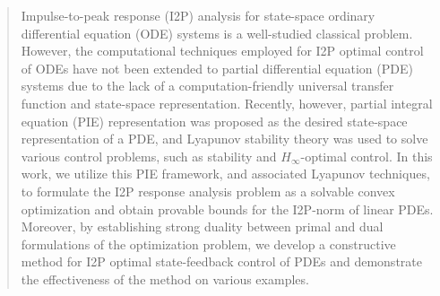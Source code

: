 \documentclass[letterpaper, 10 pt, conference]{ieeeconf}
\theoremstyle{definition}
\begin{document}
\begin{abstract}
Impulse-to-peak response (I2P) analysis for state-space ordinary differential equation (ODE) systems is a well-studied classical problem. However, the computational techniques employed for I2P optimal control of ODEs have not been extended to partial differential equation (PDE) systems due to the lack of a computation-friendly universal transfer function and state-space representation. Recently, however, partial integral equation (PIE) representation was proposed as the desired state-space representation of a PDE, and Lyapunov stability theory was used to solve various control problems, such as stability and $H_\infty$-optimal control. In this work, we utilize this PIE framework, and associated Lyapunov techniques, to formulate the I2P response analysis problem as a solvable convex optimization and obtain provable bounds for the I2P-norm of linear PDEs. Moreover, by establishing strong duality between primal and dual formulations of the optimization problem, we develop a constructive method for I2P optimal state-feedback control of PDEs and demonstrate the effectiveness of the method on various examples.






\end{abstract}
\end{document}
